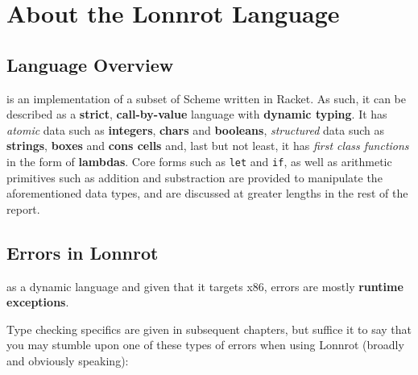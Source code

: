 \chapter*{About the Lonnrot Language}

\section{Language Overview}
 is an implementation of a subset of Scheme written in Racket.
As such, it can be described as a \textbf{strict}, \textbf{call-by-value} language with
\textbf{dynamic typing}. It has \textit{atomic} data such as \textbf{integers}, \textbf{chars} and
\textbf{booleans}, \textit{structured} data such as \textbf{strings}, \textbf{boxes} and
\textbf{cons cells} and, last but not least, it has \textit{first class functions} in the form
of \textbf{lambdas}. Core forms such as \texttt{let} and \texttt{if}, as well as arithmetic primitives
such as addition and substraction are provided to manipulate the aforementioned data types, and
are discussed at greater lengths in the rest of the report.\\

\section{Errors in Lonnrot}
 as a dynamic language and given that it targets
x86, errors are mostly \textbf{runtime exceptions}.

Type checking specifics are given in subsequent
chapters, but suffice it to say that you may stumble upon one of these types of errors when
using Lonnrot (broadly and obviously speaking):

